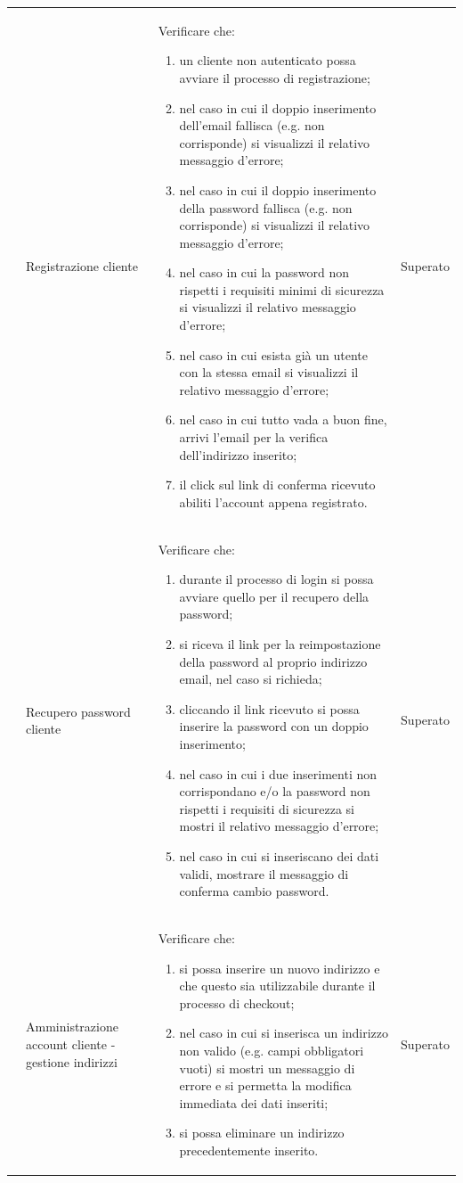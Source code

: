 \begin{center}
\begin{longtable}{|p{0.85cm}|p{2.25cm}|p{9cm}|p{3cm}|}
		 & Registrazione cliente & Verificare che:
		\begin{enumerate}
			\item un cliente non autenticato possa avviare il processo di registrazione;
			\item nel caso in cui il doppio inserimento dell'email fallisca (e.g. non corrisponde) si visualizzi il relativo messaggio d'errore;
			\item nel caso in cui il doppio inserimento della password fallisca (e.g. non corrisponde) si visualizzi il relativo messaggio d'errore;
			\item nel caso in cui la password non rispetti i requisiti minimi di sicurezza si visualizzi il relativo messaggio d'errore;
			\item nel caso in cui esista già un utente con la stessa email si visualizzi il relativo messaggio d'errore;
			\item nel caso in cui tutto vada a buon fine, arrivi l'email per la verifica dell'indirizzo inserito;
			\item il click sul link di conferma ricevuto abiliti l'account appena registrato.
		\end{enumerate} & Superato\\

		 & Recupero password cliente & Verificare che:
		\begin{enumerate}
			\item durante il processo di login si possa avviare quello per il recupero della password;
			\item si riceva il link per la reimpostazione della password al proprio indirizzo email, nel caso si richieda;
			\item cliccando il link ricevuto si possa inserire la password con un doppio inserimento;
			\item nel caso in cui i due inserimenti non corrispondano e/o la password non rispetti i requisiti di sicurezza si mostri il relativo messaggio d'errore;
			\item nel caso in cui si inseriscano dei dati validi, mostrare il messaggio di conferma cambio password.
		\end{enumerate} & Superato\\

		 & Amministrazione account cliente - gestione indirizzi & Verificare che:
		\begin{enumerate}
			\item si possa inserire un nuovo indirizzo e che questo sia utilizzabile durante il processo di checkout; 
			\item nel caso in cui si inserisca un indirizzo non valido (e.g. campi obbligatori vuoti) si mostri un messaggio di errore e si permetta la modifica immediata dei dati inseriti;
			\item si possa eliminare un indirizzo precedentemente inserito.
		\end{enumerate} & Superato\\


\end{longtable}
\end{center}
